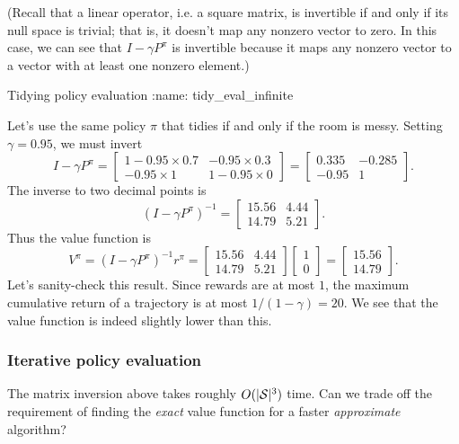 \documentclass[\main/main]{subfiles}
\begin{document}
(Recall that a linear operator, i.e. a square matrix, is invertible if and only if its null space is trivial; that is, it doesn't map any nonzero vector to zero. In this case, we can see that $I - \gamma P^\pi$ is invertible because it maps any nonzero vector to a vector with at least one nonzero element.)

\begin{example}{Tidying policy evaluation}
:name: tidy_eval_infinite

    Let's use the same policy $\pi$ that tidies if and only if the room is messy.
    Setting $\gamma = 0.95$, we must invert
    \[
        I - \gamma P^{\pi} = \begin{bmatrix} 1 - 0.95 \times 0.7 & - 0.95 \times 0.3 \\ - 0.95 \times 1 & 1 - 0.95 \times 0 \end{bmatrix} = \begin{bmatrix} 0.335 & -0.285 \\ -0.95 & 1 \end{bmatrix}.
    \]
    The inverse to two decimal points is
    \[
        (I - \gamma P^{\pi})^{-1} = \begin{bmatrix} 15.56 & 4.44 \\ 14.79 & 5.21 \end{bmatrix}.
    \]
    Thus the value function is
    \[
        V^{\pi} = (I - \gamma P^{\pi})^{-1} r^{\pi} = \begin{bmatrix} 15.56 & 4.44 \\ 14.79 & 5.21 \end{bmatrix} \begin{bmatrix} 1 \\ 0 \end{bmatrix} = \begin{bmatrix} 15.56 \\ 14.79 \end{bmatrix}.
    \]
    Let's sanity-check this result. Since rewards are at most $1$, the maximum cumulative return of a trajectory is at most $1/(1-\gamma) = 20$. We see that the value function is indeed slightly lower than this.
\end{example}


\subsubsection{Iterative policy evaluation}
\label{sec:iterative_pe}

The matrix inversion above takes roughly $O(|\S|^3)$ time. Can we trade off the requirement of finding the \emph{exact} value function for a faster \emph{approximate} algorithm?
\end{document}
